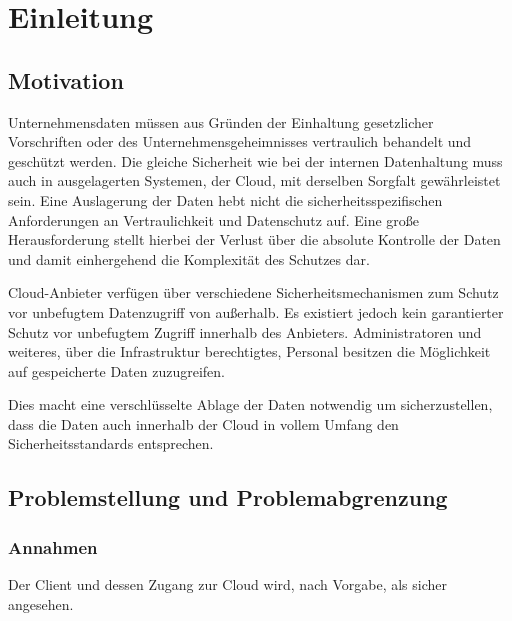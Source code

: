 \documentclass[12pt,a4paper,bibliography=totocnumbered,listof=totocnumbered]{scrartcl}
\begin{document}
\renewcommand{\sectionmark}[1]{\markright{#1}}
\renewcommand{\subsectionmark}[1]{}
\renewcommand{\subsubsectionmark}[1]{}
\rhead{\rightmark}

\doublespacing
\renewcommand{\thesection}{\arabic{section}}
\renewcommand{\theHsection}{\arabic{section}}
\setcounter{section}{0}
\setcounter{page}{1}

\section{Einleitung}
\subsection{Motivation}
Unternehmensdaten müssen aus Gründen der Einhaltung gesetzlicher Vorschriften oder des Unternehmensgeheimnisses vertraulich behandelt und geschützt werden. Die gleiche Sicherheit wie bei der internen Datenhaltung muss auch in ausgelagerten Systemen, der Cloud, mit derselben Sorgfalt gewährleistet sein. Eine Auslagerung der Daten hebt nicht die sicherheitsspezifischen Anforderungen an Vertraulichkeit und Datenschutz auf. Eine große Herausforderung stellt hierbei der Verlust über die absolute Kontrolle der Daten und damit einhergehend die Komplexität des Schutzes dar.

Cloud-Anbieter verfügen über verschiedene Sicherheitsmechanismen zum Schutz vor unbefugtem Datenzugriff von außerhalb. Es existiert jedoch kein garantierter Schutz vor unbefugtem Zugriff innerhalb des Anbieters. Administratoren und weiteres, über die Infrastruktur berechtigtes, Personal besitzen die Möglichkeit auf gespeicherte Daten zuzugreifen.

Dies macht eine verschlüsselte Ablage der Daten notwendig um sicherzustellen, dass die Daten auch innerhalb der Cloud in vollem Umfang den Sicherheitsstandards entsprechen.

\subsection{Problemstellung und Problemabgrenzung}

\subsubsection{Annahmen}
Der Client und dessen Zugang zur Cloud wird, nach Vorgabe, als sicher angesehen.
\end{document}

